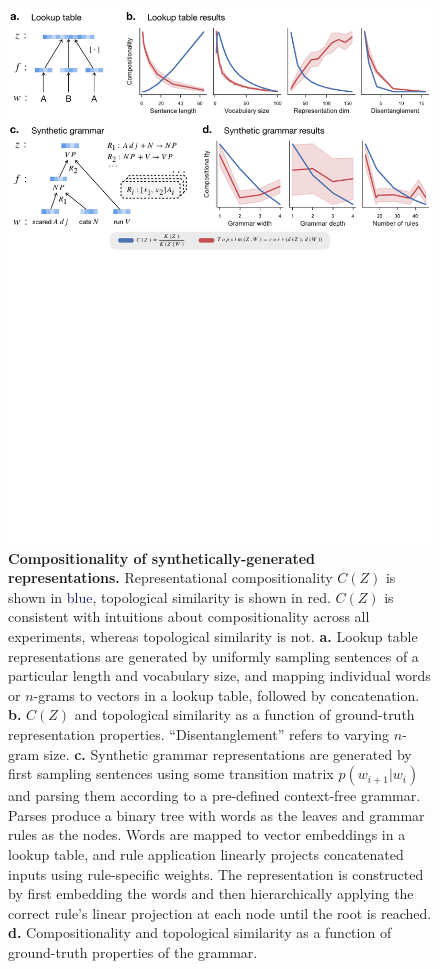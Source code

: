 \documentclass{article}
\newcommand{\Comp}{Representational compositionality}
\begin{document}
\begin{figure}[ht]
    \centering
    \includegraphics[width=\linewidth]{figures/synthetic.pdf}
    \caption{\textbf{Compositionality of synthetically-generated representations.} \Comp{} $C(Z)$ is shown in \textcolor{MidnightBlue}{blue}, topological similarity is shown in \textcolor{BrickRed}{red}. $C(Z)$ is consistent with intuitions about compositionality across all experiments, whereas topological similarity is not. \textbf{a.} Lookup table representations are generated by uniformly sampling sentences of a particular length and vocabulary size, and mapping individual words or $n$-grams to vectors in a lookup table, followed by concatenation. \textbf{b.} $C(Z)$ and topological similarity as a function of ground-truth representation properties. ``Disentanglement'' refers to varying $n$-gram size. \textbf{c.} Synthetic grammar representations are generated by first sampling sentences using some transition matrix $p(w_{i+1}|w_i)$ and parsing them according to a pre-defined context-free grammar. Parses produce a binary tree with words as the leaves and grammar rules as the nodes. Words are mapped to vector embeddings in a lookup table, and rule application linearly projects concatenated inputs using rule-specific weights. The representation is constructed by first embedding the words and then hierarchically applying the correct rule's linear projection at each node until the root is reached. \textbf{d.} Compositionality and topological similarity as a function of ground-truth properties of the grammar.}
    \label{fig:synthetic}
\end{figure}
\end{document}
